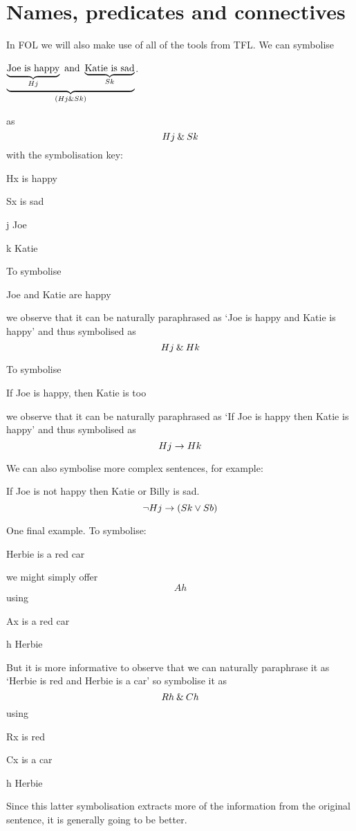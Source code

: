 \section{Names, predicates and connectives}
In FOL we will also make use of all of the tools from TFL.
We can symbolise 
\begin{earg}
\item[\ex{foland}] $\underbrace{\underbrace{\text{Joe is happy}}_{Hj}\text{ and }\underbrace{\text{Katie is sad}}_{Sk}}_{(Hj\mathbin{\&} Sk)}$.
\end{earg}
as
$$Hj\mathbin{\&} Sk$$
with the symbolisation key:
\begin{ekey}
\item[Hx] is happy
\item[Sx] is sad
\item[j] Joe
\item[k] Katie
\end{ekey}

To symbolise
\begin{earg}
\item[\ex{folor}] Joe and Katie are happy
\end{earg}
we observe that it can be naturally paraphrased as
`Joe is happy and Katie is happy' and thus symbolised as $$Hj\mathbin{\&} Hk$$

To symbolise
\begin{earg}
\item[\ex{folor}] If Joe is happy, then Katie is too
\end{earg}
we observe that it can be naturally paraphrased as
`If Joe is happy then Katie is happy' and thus symbolised as $$Hj\rightarrow Hk$$

We can also symbolise more complex sentences, for example:
\begin{earg}
\item[\ex{folcomplex}] If Joe is not happy then Katie or Billy is sad.$$\neg Hj\rightarrow (Sk\vee Sb)$$
\end{earg}


One final example. To symbolise:
\begin{earg}
\item[\ex{folredcar}] Herbie is a red car
\end{earg}
we might simply offer
$$Ah$$
using 
\begin{ekey}
\item[Ax] is a red car
\item[h] Herbie
\end{ekey}
But it is more informative to observe that we can naturally paraphrase it as `Herbie is red and Herbie is a car' so symbolise it as 
$$Rh\mathbin{\&} Ch$$
using 
\begin{ekey}
\item[Rx] is red
\item[Cx]  is a car
\item[h] Herbie
\end{ekey}
Since this latter symbolisation extracts more of the information from the original sentence, it is generally going to be better. 


